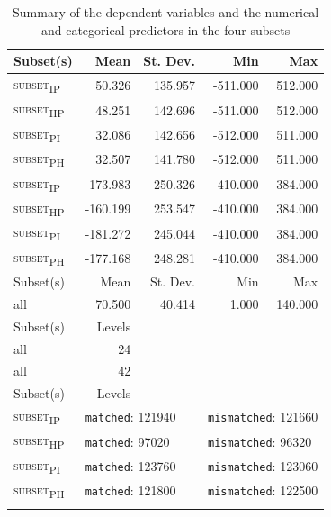 \begin{table}\fontsize{10}{11}
\caption{Summary of the dependent variables and the numerical and categorical predictors in the four subsets}
\label{tab:8.5}
\centering
\begin{tabular}{lrrrr}
\lsptoprule
Subset(s) & Mean              & St. Dev.           & Min      & Max      \\
\midrule
\textsc{subset\textsubscript{IP}}  & 50.326            & 135.957            & -511.000 & 512.000  \\
\textsc{subset\textsubscript{HP}}  & 48.251            & 142.696            & -511.000 & 512.000  \\
\textsc{subset\textsubscript{PI}}  & 32.086            & 142.656            & -512.000 & 511.000  \\
\textsc{subset\textsubscript{PH}}  & 32.507            & 141.780            & -512.000 & 511.000  \\
\textsc{subset\textsubscript{IP}}  & -173.983          & 250.326            & -410.000 & 384.000  \\
\textsc{subset\textsubscript{HP}}  & -160.199          & 253.547            & -410.000 & 384.000  \\
\textsc{subset\textsubscript{PI}}  & -181.272          & 245.044            & -410.000 & 384.000  \\
\textsc{subset\textsubscript{PH}}  & -177.168          & 248.281            & -410.000 & 384.000  \\
\midrule
Subset(s) & Mean              & St. Dev.           & Min      & Max      \\
\midrule
all       & 70.500            & 40.414             & 1.000    & 140.000  \\
\midrule
Subset(s) & \multirow{1}{*}{Levels}            & ~                  & ~        & ~        \\
\midrule
all       & \multirow{1}{*}{24}                & ~                  & ~        & ~        \\
all       & \multirow{1}{*}{42}                & ~                  & ~        & ~        \\
\midrule
Subset(s) & \multirow{1}{*}{Levels}            &                    &          &          \\
\midrule
\textsc{subset\textsubscript{IP}}  & \multicolumn{2}{l}{\texttt{matched}: 121940} & \multicolumn{2}{l}{\texttt{mismatched}: 121660}    \\

\textsc{subset\textsubscript{HP}}  & \multicolumn{2}{l}{\texttt{matched}: 97020} & \multicolumn{2}{l}{\texttt{mismatched}: 96320}    \\

\textsc{subset\textsubscript{PI}}  & \multicolumn{2}{l}{\texttt{matched}: 123760} & \multicolumn{2}{l}{\texttt{mismatched}: 123060}    \\

\textsc{subset\textsubscript{PH}}  & \multicolumn{2}{l}{\texttt{matched}: 121800} & \multicolumn{2}{l}{\texttt{mismatched}: 122500}    \\
\lspbottomrule
\end{tabular}
\end{table}

